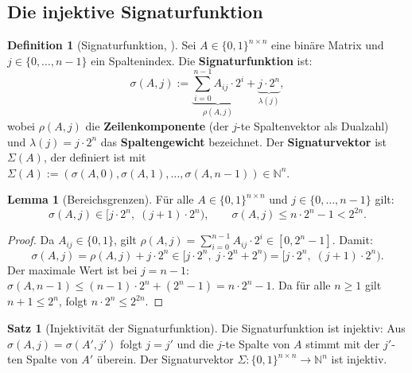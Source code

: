 ﻿\documentclass[a4paper,12pt]{article}
\theoremstyle{definition}
\newtheorem{definition}{Definition}[section]
\newtheorem{satz}{Satz}[section]
\newtheorem{lemma}{Lemma}[section]
\begin{document}
\subsection{Die injektive Signaturfunktion}

\begin{definition}[Signaturfunktion, \cite{Epp26b}]
\label{def:pqc-sigma}
Sei $A \in \{0,1\}^{n \times n}$ eine binäre Matrix und $j \in \{0,\ldots,n-1\}$
ein Spaltenindex. Die \textbf{Signaturfunktion} ist:
\[
  \sigma(A, j) := \underbrace{\sum_{i=0}^{n-1} A_{ij} \cdot 2^i}_{\displaystyle\rho(A,j)}
  + \underbrace{j \cdot 2^n}_{\displaystyle\lambda(j)},
\]
wobei $\rho(A,j)$ die \textbf{Zeilenkomponente} (der $j$-te Spaltenvektor als
Dualzahl) und $\lambda(j) = j \cdot 2^n$ das \textbf{Spaltengewicht} bezeichnet.
Der \textbf{Signaturvektor} ist $\Sigma(A)$, der definiert ist mit
$\Sigma(A) := (\sigma(A,0), \sigma(A,1), \ldots, \sigma(A,n-1)) \in \mathbb{N}^n$.
\end{definition}

\begin{lemma}[Bereichsgrenzen]
\label{lem:pqc-bounds}
Für alle $A \in \{0,1\}^{n \times n}$ und $j \in \{0,\ldots,n-1\}$ gilt:
\[
  \sigma(A,j) \in \bigl[j \cdot 2^n,\; (j+1)\cdot 2^n\bigr),
  \qquad \sigma(A,j) \leq n \cdot 2^n - 1 < 2^{2n}.
\]
\end{lemma}

\begin{proof}
Da $A_{ij} \in \{0,1\}$, gilt $\rho(A,j) = \sum_{i=0}^{n-1}A_{ij}\cdot 2^i
\in [0, 2^n-1]$. Damit:
\[
  \sigma(A,j) = \rho(A,j) + j \cdot 2^n \in [j \cdot 2^n,\; j \cdot 2^n + 2^n)
  = [j \cdot 2^n,\; (j+1) \cdot 2^n).
\]
Der maximale Wert ist bei $j = n-1$:
$\sigma(A,n-1) \leq (n-1)\cdot 2^n + (2^n - 1) = n\cdot 2^n - 1$.
Da für alle $n \geq 1$ gilt $n + 1 \leq 2^n$, folgt $n \cdot 2^n \leq 2^{2n}$.
\end{proof}

\begin{satz}[Injektivität der Signaturfunktion]
\label{satz:pqc-inj}
Die Signaturfunktion ist injektiv: Aus $\sigma(A,j) = \sigma(A',j')$
folgt $j = j'$ und die $j$-te Spalte von $A$ stimmt mit der $j'$-ten Spalte
von $A'$ überein.
Der Signaturvektor $\Sigma: \{0,1\}^{n \times n} \to \mathbb{N}^n$ ist injektiv.
\end{satz}
\end{document}
